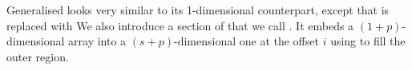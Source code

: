 Generalised  looks very similar to its 1-dimensional
counterpart, except that  is replaced with 
We also introduce a section of  that we call .
It embeds a $(1+p)$-dimensional array into a $(s+p)$-dimensional
one at the offset $i$ using  to fill the outer region.
\begin{mathpar}
\end{mathpar}
